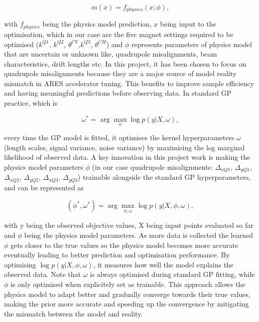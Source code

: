\begin{equation}
    \label{eq_physics_prior}
    m(x) = f_{physics}(x; \phi),
\end{equation}

with $f_{physics}$ being the physics model prediction, $x$ being input to the optimisation, which in our case are the five magnet settings required to be optimised ($k^{Q1}$, $k^{Q2}$, $\theta^{CV}$,$k^{Q3}$, $\theta^{CH}$) 
and $\phi$ represents parameters of physics model that are uncertain or unknown like, quadrupole misalignments, beam characteristics, drift lengths etc. In this project, it has been chosen to focus on quadrupole misalignments because they are a major source of model reality mismatch in ARES accelerator tuning.
This benefits to improve sample efficiency and having meaningful predictions before observing data. 
In standard GP practice, which is


\begin{equation}
    \label{eq_bo_kernel_hyperparameters}
    \omega^* = \arg\max_\omega \log p(y | X, \omega),
\end{equation}

every time the GP model is fitted, it optimises the kernel hyperparameters $\omega$ (length scales, signal variance,
noise variance) by maximising the log marginal likelihood of observed data. A key innovation in this project work is making the physics model parameters $\phi$ (in our case quadrupole misalignments: $\Delta_{xQ1}$, $\Delta_{yQ1}$, $\Delta_{xQ2}$, $\Delta_{yQ2}$, $\Delta_{xQ3}$, $\Delta_{yQ3}$) trainable alongside the standard GP hyperparameters, and can be represented as 


\begin{equation}
    \label{eq_bo_physics_parameters}
    (\phi^*, \omega^*) = \arg\max_{\phi, \omega} \log p(y | X, \phi, \omega),
\end{equation}

with y being the observed objective values, X being input points evaluated so far and $\phi$ being the physics model parameters. As more data is collected the learned $\phi$ gets closer to the true values so the physics model becomes more accurate eventually leading to better prediction and optimisation performance. 
By optimising $\log p(y | X, \phi, \omega)$, it measures how well the model explains the observed data. 
Note that $\omega$ is always optimised during standard GP fitting, while $\phi$ is only optimised when explicitely set as trainable. This approach allows the physics model to adapt better and gradually converge towards their true values, making the prior more accurate and speeding up the convergence by mitigating the mismatch between the model and reality.


